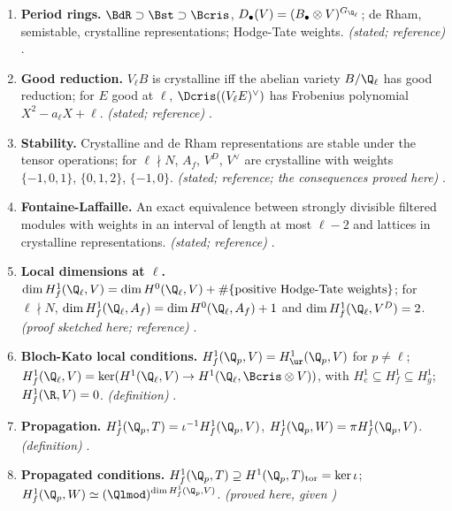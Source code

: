 \begin{enumerate}[label=\textbf{\thechapter.\arabic*}]
multiplicative primes and $e_\ell(E,p)$ at additive primes. \emph{(the lattice statements proved here; the value and valuation proved in )} .
\item \textbf{Period rings.} $\BdR\supset\Bst\supset\Bcris$, $D_\bullet(V)=(B_\bullet\otimes V)^{G_{\Q_\ell}}$; de Rham, semistable, crystalline representations; Hodge-Tate weights. \emph{(stated; reference)}
.
\item \textbf{Good reduction.} $V_\ell B$ is crystalline iff the abelian variety $B/\Q_\ell$ has good reduction; for $E$ good at $\ell$, $\Dcris((V_\ell E)^\vee)$ has Frobenius polynomial
$X^2-a_\ell X+\ell$. \emph{(stated; reference)} .
\item \textbf{Stability.} Crystalline and de Rham representations are stable under the tensor operations; for $\ell\nmid N$, $A_f$, $V^D$, $V^\vee$ are crystalline with weights $\{-1,0,1\}$,
$\{0,1,2\}$, $\{-1,0\}$. \emph{(stated; reference; the consequences proved here)} .
\item \textbf{Fontaine-Laffaille.} An exact equivalence between strongly divisible filtered modules with weights in an interval of length at most $\ell-2$ and lattices in
crystalline representations. \emph{(stated; reference)} .
\item \sloppy \textbf{Local dimensions at $\ell$.} $\dim H^1_f(\Q_\ell,V)=\dim H^0(\Q_\ell,V)+\#\{\text{positive Hodge-Tate weights}\}$; for $\ell\nmid N$, $\dim H^1_f(\Q_\ell,A_f)=\dim H^0(\Q_\ell,A_f)+1$ and
$\dim H^1_f(\Q_\ell,V^D)=2$. \emph{(proof sketched here; reference)} .
\item \textbf{Bloch-Kato local conditions.} $H^1_f(\Q_p,V)=H^1_{\ur}(\Q_p,V)$ for $p\ne\ell$; $H^1_f(\Q_\ell,V)=\ker(H^1(\Q_\ell,V)\to H^1(\Q_\ell,\Bcris\otimes V))$, with $H^1_e\subseteq H^1_f\subseteq H^1_g$;
$H^1_f(\R,V)=0$. \emph{(definition)} .
\item \textbf{Propagation.} $H^1_f(\Q_p,T)=\iota^{-1}H^1_f(\Q_p,V)$, $H^1_f(\Q_p,W)=\pi H^1_f(\Q_p,V)$. \emph{(definition)} .
\item \sloppy \textbf{Propagated conditions.} $H^1_f(\Q_p,T)\supseteq H^1(\Q_p,T)_{\mathrm{tor}}=\ker\iota$; $H^1_f(\Q_p,W)\simeq(\Qlmod)^{\dim H^1_f(\Q_p,V)}$. \emph{(proved here, given )}

\end{enumerate}
